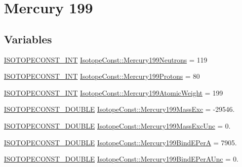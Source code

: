\hypertarget{group___isotope_const-_mercury-_hg199}{}\section{Mercury 199}
\label{group___isotope_const-_mercury-_hg199}
\subsection*{Variables}
\begin{DoxyCompactItemize}
\item 
\mbox{\hyperlink{group___isotope_const-_macros_ga5f18360b3e99483a35c32d789e62621c}{I\+S\+O\+T\+O\+P\+E\+C\+O\+N\+S\+T\+\_\+\+I\+NT}} \mbox{\hyperlink{group___isotope_const-_mercury-_hg199_gad2f0ef693e58580bc69c9c55aee9cfcc}{Isotope\+Const\+::\+Mercury199\+Neutrons}} = 119
\item 
\mbox{\hyperlink{group___isotope_const-_macros_ga5f18360b3e99483a35c32d789e62621c}{I\+S\+O\+T\+O\+P\+E\+C\+O\+N\+S\+T\+\_\+\+I\+NT}} \mbox{\hyperlink{group___isotope_const-_mercury-_hg199_ga85f9f14d9eec479ec28a93d496328201}{Isotope\+Const\+::\+Mercury199\+Protons}} = 80
\item 
\mbox{\hyperlink{group___isotope_const-_macros_ga5f18360b3e99483a35c32d789e62621c}{I\+S\+O\+T\+O\+P\+E\+C\+O\+N\+S\+T\+\_\+\+I\+NT}} \mbox{\hyperlink{group___isotope_const-_mercury-_hg199_ga977f43069eacd27078ec466fde7f65d3}{Isotope\+Const\+::\+Mercury199\+Atomic\+Weight}} = 199
\item 
\mbox{\hyperlink{group___isotope_const-_macros_ga8f45a7272ce02c0b4c65c44636ed719a}{I\+S\+O\+T\+O\+P\+E\+C\+O\+N\+S\+T\+\_\+\+D\+O\+U\+B\+LE}} \mbox{\hyperlink{group___isotope_const-_mercury-_hg199_ga8f784d25d34b9f1fc2f3d14e9631c3cf}{Isotope\+Const\+::\+Mercury199\+Mass\+Exc}} = -\/29546.
\item 
\mbox{\hyperlink{group___isotope_const-_macros_ga8f45a7272ce02c0b4c65c44636ed719a}{I\+S\+O\+T\+O\+P\+E\+C\+O\+N\+S\+T\+\_\+\+D\+O\+U\+B\+LE}} \mbox{\hyperlink{group___isotope_const-_mercury-_hg199_gafe643b282ad9dbc46d3c6c48896c0aba}{Isotope\+Const\+::\+Mercury199\+Mass\+Exc\+Unc}} = 0.
\item 
\mbox{\hyperlink{group___isotope_const-_macros_ga8f45a7272ce02c0b4c65c44636ed719a}{I\+S\+O\+T\+O\+P\+E\+C\+O\+N\+S\+T\+\_\+\+D\+O\+U\+B\+LE}} \mbox{\hyperlink{group___isotope_const-_mercury-_hg199_ga5e64ba3468569ad59a75091504d0dc2a}{Isotope\+Const\+::\+Mercury199\+Bind\+E\+PerA}} = 7905.
\item 
\mbox{\hyperlink{group___isotope_const-_macros_ga8f45a7272ce02c0b4c65c44636ed719a}{I\+S\+O\+T\+O\+P\+E\+C\+O\+N\+S\+T\+\_\+\+D\+O\+U\+B\+LE}} \mbox{\hyperlink{group___isotope_const-_mercury-_hg199_ga14a4fd9447d845f8f78df2944f6aeeef}{Isotope\+Const\+::\+Mercury199\+Bind\+E\+Per\+A\+Unc}} = 0.

\end{DoxyCompactItemize}
